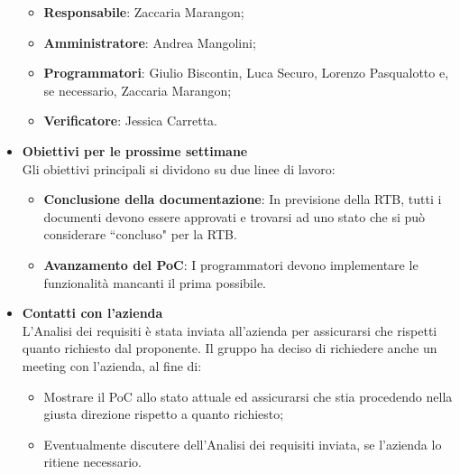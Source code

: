\begin{itemize}
        \begin{itemize}
            \item \textbf{Responsabile}: Zaccaria Marangon;
            \item \textbf{Amministratore}: Andrea Mangolini;
            \item \textbf{Programmatori}: Giulio Biscontin, Luca Securo, Lorenzo Pasqualotto e, se necessario, Zaccaria Marangon;
            \item \textbf{Verificatore}: Jessica Carretta.
        \end{itemize}
        \item \textbf{Obiettivi per le prossime settimane}\\
        Gli obiettivi principali si dividono su due linee di lavoro:
        \begin{itemize}
            \item \textbf{Conclusione della documentazione}: In previsione della RTB, tutti i documenti devono essere approvati e trovarsi ad uno stato che si può considerare ``concluso" per la RTB.
            \item \textbf{Avanzamento del PoC}: I programmatori devono implementare le funzionalità mancanti il prima possibile.
        \end{itemize}
        \item \textbf{Contatti con l'azienda} \\
        L'Analisi dei requisiti è stata inviata all'azienda per assicurarsi che rispetti quanto richiesto dal proponente. Il gruppo ha deciso di richiedere anche un meeting con l'azienda, al fine di:
        \begin{itemize}
            \item Mostrare il PoC allo stato attuale ed assicurarsi che stia procedendo nella giusta direzione rispetto a quanto richiesto;
            \item Eventualmente discutere dell'Analisi dei requisiti inviata, se l'azienda lo ritiene necessario.
        \end{itemize}
    \end{itemize}
